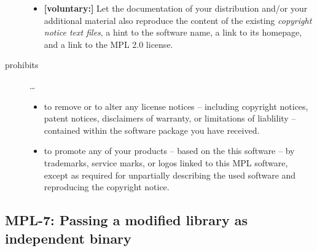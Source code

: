 \begin{description}
\begin{itemize}
  \item \textbf{[voluntary:]} Let the documentation of your distribution and/or
  your additional material  also reproduce the content of the existing
  \emph{copyright notice text files}, a hint to the software name, a link to its
  homepage, and a link to the MPL 2.0 license.

\end{itemize}

\item[prohibits] \ldots
\begin{itemize}
  \item to remove or to alter any license notices -- including copyright
  notices, patent notices, disclaimers of warranty, or limitations of liablility
  -- contained within the software package you have received.
  \item to promote any of your products -- based on the this software -- by
  trademarks, service marks, or logos linked to this MPL software, except as
  required for unpartially describing the used software and reproducing the
  copyright notice.
\end{itemize}

\end{description}


\subsection{MPL-7: Passing a modified library as independent binary}
\label{OSUC-08B-MPL}

